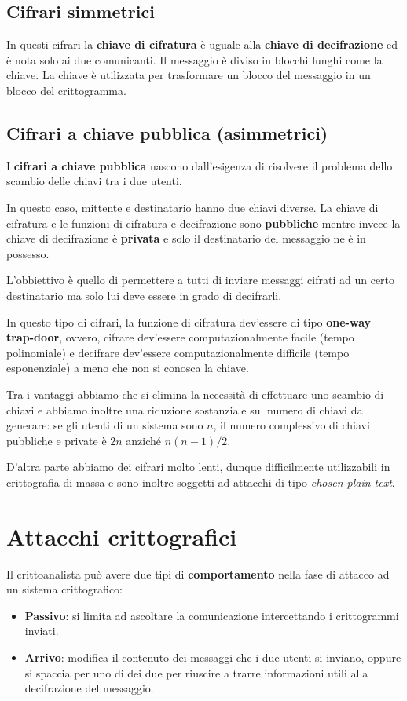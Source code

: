 \subsection{Cifrari simmetrici}
In questi cifrari la \textbf{chiave di cifratura} \`e uguale alla \textbf{chiave di decifrazione} ed \`e nota solo ai
due comunicanti. Il messaggio \`e diviso in blocchi lunghi come la chiave. La chiave \`e utilizzata per trasformare un
blocco del messaggio in un blocco del crittogramma.

\subsection{Cifrari a chiave pubblica (asimmetrici)}
I \textbf{cifrari a chiave pubblica} nascono dall'esigenza di risolvere il problema dello scambio delle chiavi tra i due
utenti.

In questo caso, mittente e destinatario hanno due chiavi diverse. La chiave di cifratura e le funzioni di cifratura e
decifrazione sono \textbf{pubbliche} mentre invece la chiave di decifrazione \`e \textbf{privata} e solo il destinatario
del messaggio ne \`e in possesso.

L'obbiettivo \`e quello di permettere a tutti di inviare messaggi cifrati ad un certo destinatario ma solo lui deve
essere in grado di decifrarli.

In questo tipo di cifrari, la funzione di cifratura dev'essere di tipo \textbf{one-way trap-door}, ovvero, cifrare
dev'essere computazionalmente facile (tempo polinomiale) e decifrare dev'essere computazionalmente difficile (tempo
esponenziale) a meno che non si conosca la chiave.

Tra i vantaggi abbiamo che si elimina la necessit\`a di effettuare uno scambio di chiavi e abbiamo inoltre una riduzione
sostanziale sul numero di chiavi da generare: se gli utenti di un sistema sono $n$, il numero complessivo di chiavi
pubbliche e private \`e $2n$ anzich\'e $n (n-1) / 2$.

D'altra parte abbiamo dei cifrari molto lenti, dunque difficilmente utilizzabili in crittografia di massa e sono inoltre
soggetti ad attacchi di tipo \emph{chosen plain text}.

\section{Attacchi crittografici}
Il crittoanalista pu\`o avere due tipi di \textbf{comportamento} nella fase di attacco ad un sistema crittografico:
\begin{itemize}
	\item \textbf{Passivo}: si limita ad ascoltare la comunicazione intercettando i crittogrammi inviati.
	\item \textbf{Arrivo}: modifica il contenuto dei messaggi che i due utenti si inviano, oppure si spaccia per uno di
	      dei due per riuscire a trarre informazioni utili alla decifrazione del messaggio.
\end{itemize}

